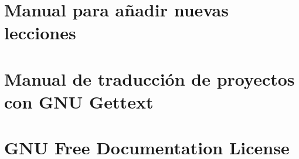 \documentclass[a4paper,12pt]{scrbook}
\begin{document}
\chapter{Manual para añadir nuevas lecciones}


\chapter{Manual de traducción de proyectos con GNU Gettext}
\label{sec:gettext}


\chapter{GNU Free Documentation License}
\label{sec:fdl}







\printindex
\end{document}
